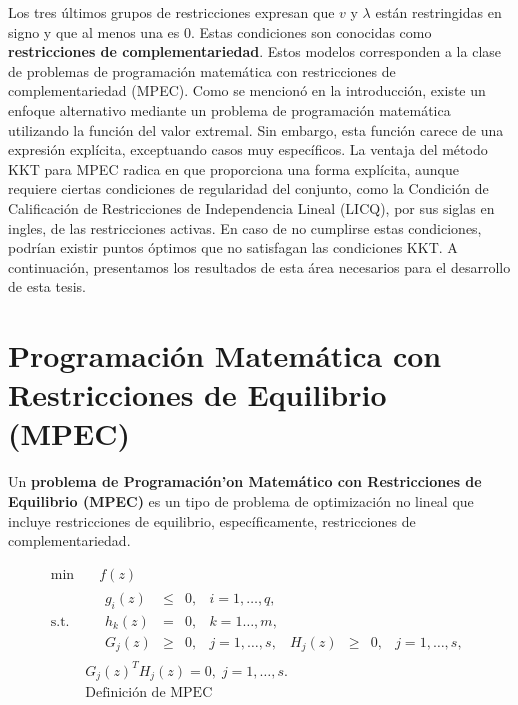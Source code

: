 Los tres últimos grupos de restricciones expresan que $v$ y $\lambda$ están restringidas en signo y que al menos una es 0. Estas condiciones son conocidas como \textbf{restricciones de complementariedad}. Estos modelos corresponden a la clase de problemas de programación matemática con restricciones de complementariedad (MPEC). 
Como se mencionó en la introducción, existe un enfoque alternativo mediante un problema de programación matemática utilizando la función del valor extremal. Sin embargo, esta función carece de una expresión explícita, exceptuando casos muy específicos. La ventaja del método KKT para MPEC radica en que proporciona una forma explícita, aunque requiere ciertas condiciones de regularidad del conjunto, como la Condición de Calificación de Restricciones de Independencia Lineal (LICQ), por sus siglas en ingles, de las restricciones activas. En caso de no cumplirse estas condiciones, podrían existir puntos óptimos que no satisfagan las condiciones KKT.
A continuación, presentamos los resultados de esta área necesarios para el desarrollo de esta tesis.

\section{Programación Matemática con Restricciones de Equilibrio (MPEC)}
Un \textbf{problema de Programación'on Matemático con Restricciones de Equilibrio (MPEC)} es un tipo de  problema de optimización no lineal que incluye restricciones de equilibrio, específicamente, restricciones de complementariedad.

\begin{equation}
\begin{aligned}
\min  &\quad  f(z)  \\
\text{s.t.} &\quad \begin{matrix} g_i(z)& \leq& 0, &i=1,\ldots,q, \\ h_k(z) &=& 0,&k=1\ldots,m, \\
 G_j(z) &\geq& 0, & j=1,\ldots,s,& H_j(z) &\geq& 0, & j=1,\ldots,s, \end{matrix}
\\&G_j(z)^T H_j(z) = 0,\; j=1,\ldots,s. \\
&\text{Definición de MPEC} \\
\end{aligned}  
\label{eq:DefMpec}
\end{equation}

